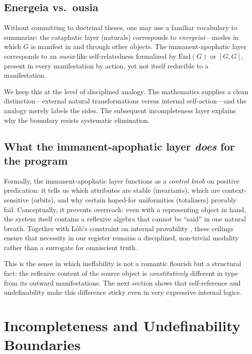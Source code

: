 \documentclass[11pt]{article}
\theoremstyle{upright}
\begin{document}
\subsection{Energeia vs.\ ousia}
Without committing to doctrinal theses, one may use a familiar vocabulary to summarize: the cataphatic layer (naturals) corresponds to \emph{energeiai}—modes in which \(G\) is manifest in and through other objects. The immanent-apophatic layer corresponds to an \emph{ousia}-like self-relatedness formalized by \(\mathrm{End}(G)\) or \([G,G]\), present in every manifestation by action, yet not itself reducible to a manifestation.

We keep this at the level of disciplined analogy. The mathematics supplies a clean distinction—external natural transformations versus internal self-action—and the analogy merely labels the sides. The subsequent incompleteness layer explains why the boundary resists systematic elimination.

\subsection{What the immanent-apophatic layer \emph{does} for the program}
Formally, the immanent-apophatic layer functions as a \emph{control knob} on positive predication: it tells us which attributes are stable (invariants), which are context-sensitive (orbits), and why certain hoped-for uniformities (totalizers) provably fail. Conceptually, it prevents overreach: even with a representing object in hand, the system itself contains a reflexive algebra that cannot be “said” in one natural breath. Together with Löb's constraint on internal provability \citep{Loeb1955}, these ceilings ensure that necessity in our register remains a disciplined, non-trivial modality rather than a surrogate for omniscient truth.

This is the sense in which ineffability is not a romantic flourish but a structural fact: the reflexive content of the source object is \emph{constitutively} different in type from its outward manifestations. The next section shows that self-reference and undefinability make this difference sticky even in very expressive internal logics.

\section{Incompleteness and Undefinability Boundaries}\label{sec:incompl}
\end{document}
